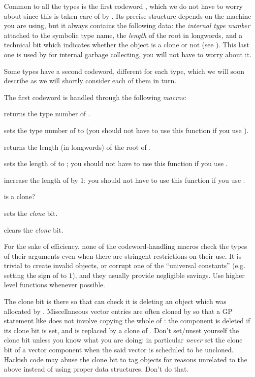 Common to all the types is the first codeword , which we do not
have to worry about since this is taken care of by . Its precise
structure depends on the machine you are using, but it always contains the
following data: the \emph{internal type number} attached
to the symbolic type name, the \emph{length} of the root in longwords, and a
technical bit which indicates whether the object is a clone or not (see
). This last one is used by  for internal garbage
collecting, you will not have to worry about it.

Some types have a second codeword, different for each type, which we will
soon describe as we will shortly consider each of them in turn.

\noindent The first codeword is handled through the following \emph{macros}:

 returns the type number of .

 sets the type number of  to
 (you should not have to use this function if you use ).

 returns the length (in longwords) of the root of .

 sets the length of  to ; you
should not have to use this function if you use .

 increase the length of  by 1; you
should not have to use this function if you use .

 is  a clone?

 sets the \emph{clone} bit.

 clears the \emph{clone} bit.

 For the sake of efficiency, none of the
codeword-handling macros check the types of their arguments even when there
are stringent restrictions on their use. It is trivial to create invalid
objects, or corrupt one of the ``universal constants'' (e.g. setting the sign
of  to $1$), and they usually provide negligible savings.
Use higher level functions whenever possible.

 The clone bit is there so that  can check
it is deleting an object which was allocated by . Miscellaneous
vector entries are often cloned by  so that a GP statement like
 does not involve copying the whole of : the component
 is deleted if its clone bit is set, and is replaced by a clone of
. Don't set/unset yourself the clone bit unless you know what you are
doing: in particular \emph{never} set the clone bit of a vector component
when the said vector is scheduled to be uncloned. Hackish code may abuse the
clone bit to tag objects for reasons unrelated to the above instead of using
proper data structures. Don't do that.

